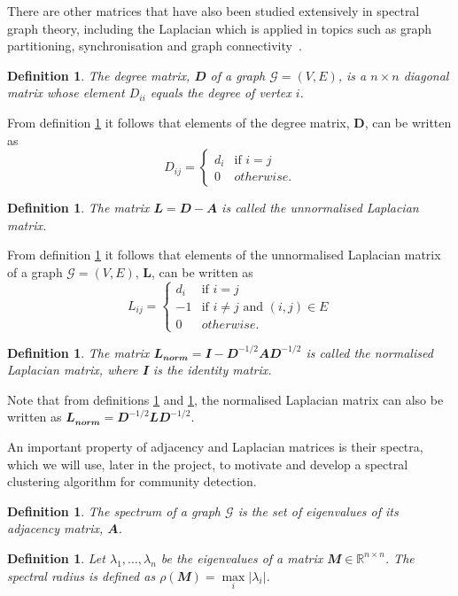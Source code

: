 \documentclass[12pt]{article}
\numberwithin{equation}{section}
\newtheorem{definition}[theorem]{Definition}
\begin{document}
There are other matrices that have also been studied extensively in spectral graph theory, including the Laplacian which is applied in topics such as graph partitioning, synchronisation and graph connectivity~\cite{For10}.
\begin{definition}
\label{def:degreeMatrix}
	The degree matrix, $\mathbfit{D}$ of a graph $\mathcal{G} = (V,E)$, is a $n \times n$ diagonal matrix whose element $D_{ii}$ equals the degree of vertex $i$.
\end{definition}
From definition \ref{def:degreeMatrix} it follows that elements of the degree matrix, $\mathbf{D}$, can be written as
\begin{equation*}
	 D_{ij} =
	\begin{cases}
		d_{i} & \text{if } i = j\\
		0 & otherwise.
	\end{cases}
\end{equation*}
\begin{definition}
\label{def:unnormalisedLaplacianMatrix}
	The matrix $\mathbfit{L} = \mathbfit{D}  - \mathbfit{A} $ is called the unnormalised Laplacian matrix.
\end{definition}
From definition \ref{def:unnormalisedLaplacianMatrix} it follows that elements of the unnormalised Laplacian matrix of a graph $\mathcal{G} = (V,E)$, $\mathbf{L}$, can be written as
\begin{equation*}
	L_{ij} =
	\begin{cases}
		d_{i} & \text{if } i = j\\
		-1 & \text{if } i \neq j \text{ and }  (i,j) \in E\\
		0 & otherwise.
	\end{cases}
\end{equation*}
\begin{definition}
\label{def:normalisedLaplacianMatrix}
	The matrix $\mathbfit{L_{norm}} = \mathbfit{I}  - \mathbfit{D}^{-1/2}\mathbfit{A}\mathbfit{D}^{-1/2}$ is called the normalised Laplacian matrix, where $\mathbfit{I}$ is the identity matrix.
\end{definition}
Note that from definitions \ref{def:unnormalisedLaplacianMatrix} and \ref{def:normalisedLaplacianMatrix}, the normalised Laplacian matrix can also be written as $\mathbfit{L_{norm}} = \mathbfit{D}^{-1/2}\mathbfit{L}\mathbfit{D}^{-1/2}$.

An important property of adjacency and Laplacian matrices is their spectra, which we will use, later in the project, to motivate and develop a spectral clustering algorithm for community detection.
\begin{definition}
\label{def:spectrum}
	The spectrum of a graph $\mathcal{G}$ is the set of eigenvalues of its adjacency matrix, $\mathbfit{A}$.
\end{definition}
\begin{definition}
\label{def:spectralRadius}
	Let $\lambda_{1},\dots,\lambda_{n}$ be the eigenvalues of a matrix $\mathbfit{M} \in \mathbb{R}^{n \times n}$. The spectral radius is defined as $\rho(\mathbfit{M}) = \max\limits_{i} \vert\lambda_{i}\vert$.
\end{definition}
\end{document}
